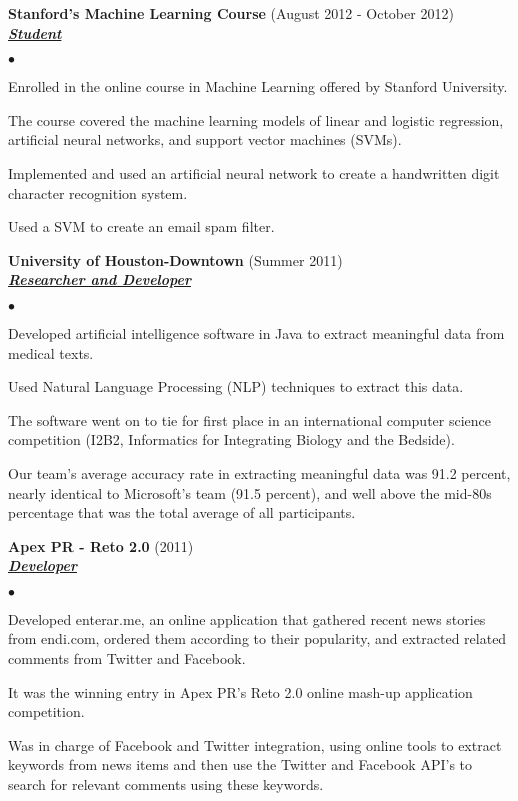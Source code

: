 \documentclass{article}
\newcommand{\employer}[3]{{ \textbf{#1} (#2)\\ \underline{\textbf{\emph{#3}}}\\  }}
\newenvironment{achievements}{\begin{list}{$\bullet$}{\topsep 0pt \itemsep -2pt}}{\vspace*{4pt}\end{list}}
\begin{document}
\employer{Stanford's Machine Learning Course}{August 2012 - October 2012}{Student}
	\begin{achievements}
	\item Enrolled in the online course in Machine Learning offered by Stanford University.
	\item The course covered the machine learning models of linear and logistic regression, artificial neural networks, and support vector machines (SVMs).
	\item Implemented and used an artificial neural network to create a handwritten digit character recognition system.
	\item Used a SVM to create an email spam filter.   	
	\end{achievements}

\employer{University of Houston-Downtown}{Summer 2011}{Researcher and Developer}
	\begin{achievements}
	\item Developed artificial intelligence software in Java to extract meaningful data from medical texts.
	\item Used Natural Language Processing (NLP) techniques to extract this data. 	
	\item The software went on to tie for first place in an international computer science competition (I2B2, Informatics for Integrating Biology and the Bedside).
	\item Our team's average accuracy rate in extracting meaningful data was 91.2 percent, nearly identical to Microsoft's team (91.5 percent), and well above the mid-80s percentage that was the total average of all participants.
 	\end{achievements}

\employer{Apex PR - Reto 2.0}{2011}{Developer}
	\begin{achievements}
	\item Developed enterar.me, an online application that gathered recent news stories from endi.com, ordered them according to their popularity, and extracted related comments from Twitter and Facebook.	
	\item It was the winning entry in Apex PR's Reto 2.0 online mash-up application competition.
	\item Was in charge of Facebook and Twitter integration, using online tools to extract keywords from news items and then use the Twitter and Facebook API's to search for relevant comments using these keywords.
	\end{achievements}
\end{document}

